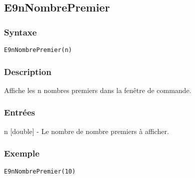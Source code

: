 \begin{minipage}{\linewidth}
\subsection*{E9nNombrePremier}
\subsubsection*{Syntaxe}
\begin{lstlisting}
E9nNombrePremier(n)
\end{lstlisting}
\subsubsection*{Description}
Affiche les n nombres premiers dans la fenêtre de commande.
\subsubsection*{Entrées}
\begin{description}
\item n [double] - Le nombre de nombre premiers à afficher. 
\end{description} 
\subsubsection*{Exemple}
\begin{lstlisting}
E9nNombrePremier(10)
\end{lstlisting} \medskip
\end{minipage}